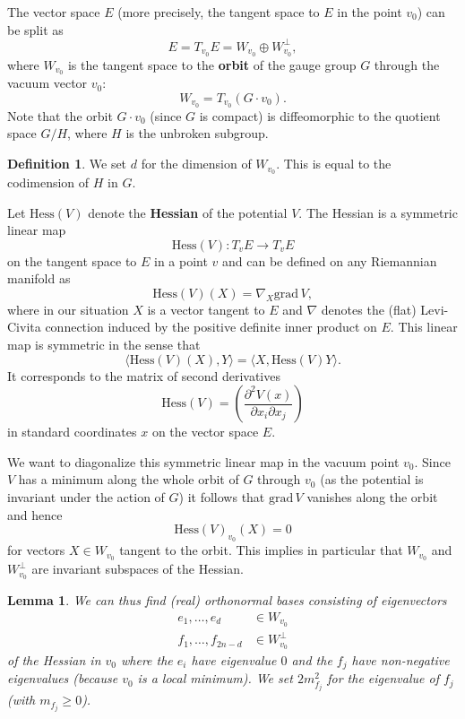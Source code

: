 \documentclass[11pt]{amsart}
\newtheorem{lem}[thm]{Lemma}
\theoremstyle{definition}
\newtheorem{defn}[thm]{Definition}
\theoremstyle{remark}
\numberwithin{equation}{section}
\begin{document}
The vector space $E$ (more precisely, the tangent space to $E$ in the point $v_0$) can be split as 
\begin{equation*}
E=T_{v_0}E=W_{v_0}\oplus W_{v_0}^\perp,
\end{equation*} 
where $W_{v_0}$ is the tangent space to the {\bf orbit} of the gauge group $G$ through the vacuum vector $v_0$:
\begin{equation*}
W_{v_0}=T_{v_0}(G\cdot v_0).
\end{equation*}
Note that the orbit $G\cdot v_0$ (since $G$ is compact) is diffeomorphic to the quotient space $G/H$, where $H$ is the unbroken subgroup. 
\begin{defn}
We set $d$ for the dimension of $W_{v_0}$. This is equal to the codimension of $H$ in $G$.
\end{defn}

Let $\mathrm{Hess}(V)$ denote the {\bf Hessian} of the potential $V$. The Hessian is a symmetric linear map 
\begin{equation*}
\mathrm{Hess}(V)\colon T_vE\longrightarrow T_vE
\end{equation*}
on the tangent space to $E$ in a point $v$ and can be defined on any Riemannian manifold as
\begin{equation*}
\mathrm{Hess}(V)(X)=\nabla_X\mathrm{grad}\,V,
\end{equation*} 
where in our situation $X$ is a vector tangent to $E$ and $\nabla$ denotes the (flat) Levi-Civita connection induced by the positive definite inner product on $E$. This linear map is symmetric in the sense that 
\begin{equation*}
\langle \mathrm{Hess}(V)(X),Y\rangle = \langle X,\mathrm{Hess}(V)Y\rangle.
\end{equation*} 
It corresponds to the matrix of second derivatives 
\begin{equation*}
\mathrm{Hess}(V)=\left(\frac{\partial^2V(x)}{\partial x_i\partial x_j}\right)
\end{equation*}
in standard coordinates $x$ on the vector space $E$.

We want to diagonalize this symmetric linear map in the vacuum point $v_0$. Since $V$ has a minimum along the whole orbit of $G$ through $v_0$ (as the potential is invariant under the action of $G$) it follows that $\mathrm{grad}\,V$ vanishes along the orbit and hence
\begin{equation*}
\mathrm{Hess}(V)_{v_0}(X)=0
\end{equation*}
for vectors $X\in W_{v_0}$ tangent to the orbit. This implies in particular that $W_{v_0}$ and $W_{v_0}^\perp$ are invariant subspaces of the Hessian.
\begin{lem}
We can thus find (real) orthonormal bases consisting of eigenvectors \begin{align*}
e_1,\ldots,e_d&\in W_{v_0}\\
f_1,\ldots,f_{2n-d}&\in W_{v_0}^\perp
\end{align*}
of the Hessian in $v_0$ where the $e_i$ have eigenvalue $0$ and the $f_j$ have non-negative eigenvalues (because $v_0$ is a local minimum). We set $2m_{f_j}^2$ for the eigenvalue of $f_j$ (with $m_{f_j}\geq 0$).
\end{lem}
\end{document}
